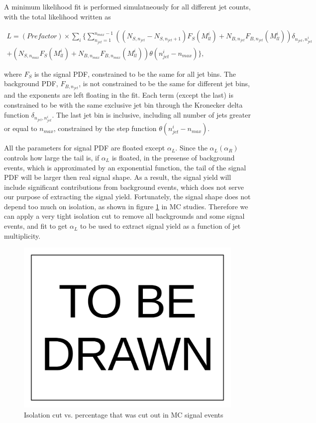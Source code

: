 \documentclass[10pt,a4paper,onecolumn]{article}
\begin{document}
A minimum likelihood fit is performed simulatneously for all different jet counts, with the total likelihood written as

\begin{eqnarray}
L = (Prefactor) \times \displaystyle\sum_i \{ \displaystyle\sum_{n_{jet}=1}^{n_{max} - 1} \left( (N_{S, n_{jet}} - N_{S, n_{jet} + 1}) F_S(M_{ll}^i) + N_{B, n_{jet}} F_{B, n_{jet}}(M_{ll}^i) \right)
\delta_{n_{jet}, n_{jet}^i}\nonumber\\
+ \left( N_{S, n_{max}} F_S(M_{ll}^i) + N_{B, n_{max}} F_{B, n_{max}}(M_{ll}^i) \right) \theta(n_{jet}^i - n_{max}) \},
\nonumber
\end{eqnarray}

where $F_S$ is the signal PDF, constrained to be the same for all jet bins.  The background PDF, $F_{B, n_{jet}}$, is not constrained to
be the same for different jet bins, and the exponents are left floating in the fit.  Each term (except the last) is constrained to be with the same exclusive jet bin
through the Kronecker delta function $\delta_{n_{jet}, n_{jet}^i}$.
The last jet bin is inclusive, including all number of jets greater or equal to $n_{max}$, constrained by the step function $\theta(n_{jet}^i - n_{max})$.

All the parameters for signal PDF are floated except $\alpha_L$.  Since the $\alpha_L (\alpha_R)$ controls how large the tail is, if $\alpha_L$ is floated,
in the presense of background events, which is approximated by an exponential function, the tail of the signal PDF will be larger then real signal shape.
As a result, the signal yield will include significant contributions from background events, which does not serve our purpose of extracting the signal yield.
Fortunately, the signal shape does not depend too much on isolation, as shown in figure \ref{Figure_SignalShapeVsIsolation} in MC studies.
Therefore we can apply a very tight isolation cut to remove all backgrounds and some signal events, and fit to get $\alpha_L$ to be used to extract signal yield
as a function of jet multiplicity.

\begin{figure}
\includegraphics[width=110mm]{ToBeDrawn.pdf}
\caption{Isolation cut vs. percentage that was cut out in MC signal events}
\label{Figure_SignalShapeVsIsolation}
\end{figure}
\end{document}
